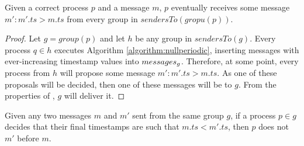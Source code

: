 \documentclass[times, 10pt]{article}
\begin{document}
\begin{lems} \label{lemma:barrierperiodic}
  Given a correct process $p$ and a message $m$, $p$ eventually receives some message $m' : m'.ts > m.ts$ from every group in $sendersTo(gropu(p))$.%
\end{lems}

\begin{proof}Let $g = group(p)$ and let $h$ be any group in $sendersTo(g)$. Every process $q \in h$ executes Algorithm \ref{algorithm:nullperiodic}, inserting messages with ever-increasing timestamp values into $messages\text{$_g$}$. Therefore, at some point, every process from $h$ will propose some message $m' : m'.ts > m.ts$. As one of these proposals will be decided, then one of these messages will be \rmcast{} to $g$. From the properties of \rmcast, $g$ will deliver it.
%
% 
% 
\end{proof}







\begin{lems} \label{lemma:lowertsfrmcastfirst}
Given any two messages $m$ and $m'$ sent from the same group $g$, if a process $p \in g$ decides that their final timestamps are such that $m.ts < m'.ts$, then $p$ does not \rmcast{} $m'$ before $m$.
\end{lems}
\end{document}
